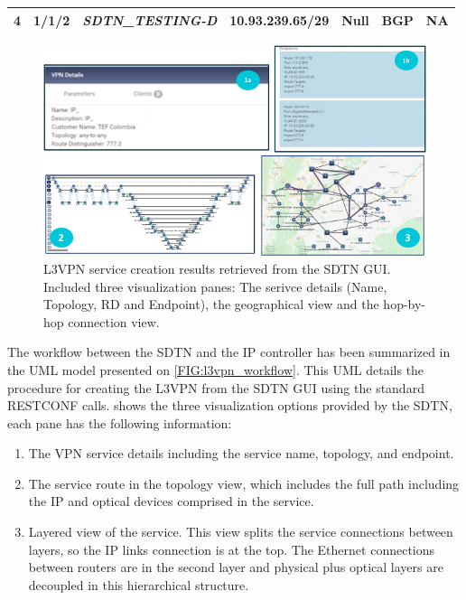 \documentclass[a4paper,fleqn]{cas-dc}
\begin{document}
\begin{table}[]
\begin{tabular}{c|c|c|l|c|cl}
\multicolumn{1}{|c|}{\multirow{-2}{*}{\textbf{4}}}          & 1/1/2                                                           & \multirow{-2}{*}{\textit{SDTN\_TESTING-D}}                & 10.93.239.65/29       & \multirow{-2}{*}{Null}                                          & \multicolumn{1}{c|}{\multirow{-2}{*}{BGP}}                          & \multicolumn{1}{l|}{\multirow{-2}{*}{NA}}                     \\ \hline
\end{tabular}
\label{TAB:discovered_ip_l3vpn}
\end{table}


\begin{figure}
	\centering
		\includegraphics[width=\linewidth]{figs/l3vpn_results_3.png}
	\caption{L3VPN service creation results retrieved from the SDTN GUI. Included three visualization panes: The serivce details (Name, Topology, RD and Endpoint), the geographical view and the hop-by-hop connection view.}
	\label{FIG:l3vpn_results}
\end{figure}

The workflow between the SDTN and the IP controller has been summarized in the UML model presented on \cref{FIG:l3vpn_workflow}. This UML details the procedure for creating the L3VPN from the SDTN GUI using the standard RESTCONF calls. 
 shows the three visualization options provided by the SDTN, each pane has the following information:
\begin{enumerate}
    \item The VPN service details including the service name, topology, and endpoint.
    \item The service route in the topology view, which includes the full path including the IP and optical devices comprised in the service.
    \item Layered view of the service. This view splits the service connections between layers, so the IP links connection is at the top. The Ethernet connections between routers are in the second layer and physical plus optical layers are decoupled in this hierarchical structure.
\end{enumerate}
\end{document}

